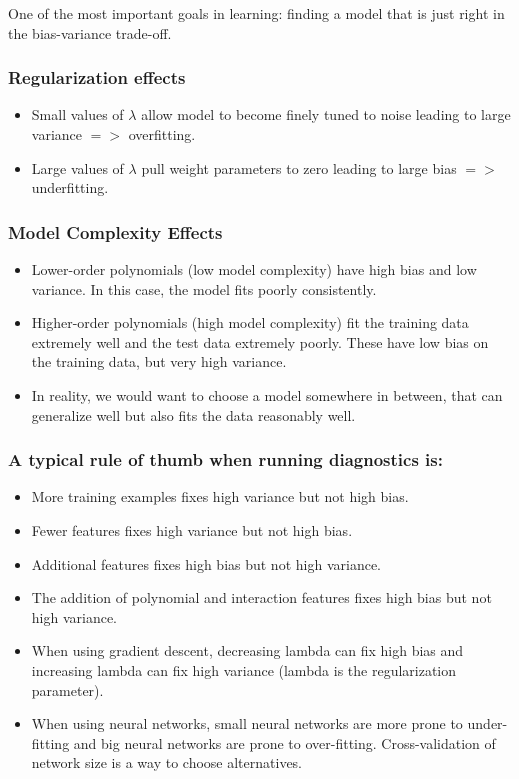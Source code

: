 One of the most important goals in learning: finding a model that is just right in the bias-variance trade-off.

\subsubsection{Regularization effects}
\begin{itemize}
\item Small values of $\lambda$ allow model to become finely tuned to noise leading to large variance $=>$ overfitting.
\item Large values of $\lambda$ pull weight parameters to zero leading to large bias $=>$ underfitting.
\end{itemize}

\subsubsection{Model Complexity Effects}
\begin{itemize}
\item Lower-order polynomials (low model complexity) have high bias and low variance. In this case, the model fits poorly consistently.
\item Higher-order polynomials (high model complexity) fit the training data extremely well and the test data extremely poorly. These have low bias on the training data, but very high variance.
\item In reality, we would want to choose a model somewhere in between, that can generalize well but also fits the data reasonably well.
\end{itemize}

\subsubsection{A typical rule of thumb when running diagnostics is:}
\begin{itemize}
\item More training examples fixes high variance but not high bias.
\item Fewer features fixes high variance but not high bias.
\item Additional features fixes high bias but not high variance.
\item The addition of polynomial and interaction features fixes high bias but not high variance.
\item When using gradient descent, decreasing lambda can fix high bias and increasing lambda can fix high variance (lambda is the regularization parameter).
\item When using neural networks, small neural networks are more prone to under-fitting and big neural networks are prone to over-fitting. Cross-validation of network size is a way to choose alternatives.
\end{itemize}

